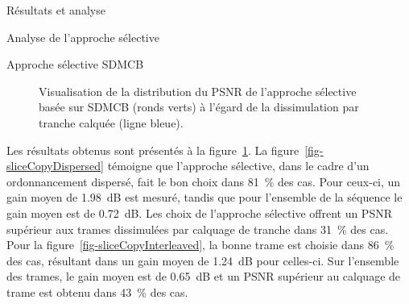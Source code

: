 \documentclass[letterpaper, twoside, 12pt,memoire]{thETS}
\newcommand{\SC}[1]{%
	{
	\todo[inline,color={red!100!green!33}]{%
	\textbf{[SC]:}~#1}
	}}
\newcommand{\fig}[1]{figure~\ref{#1}}
\providecommand{\DIFaddbegin}{} %
\providecommand{\DIFaddend}{} %
\begin{document}
\begin{chapter}{Résultats et analyse}
\begin{section}{Analyse de l'approche sélective}
\begin{subsection}{Approche sélective SDMCB}
\begin{figure}[htb]
\caption{Visualisation de la distribution du PSNR de l'approche sélective basée
sur SDMCB (ronds verts) à l'égard de la dissimulation par tranche calquée (ligne
bleue).}
\label{fig-SelectiveSliceCopy}
\end{figure}\DIFaddbegin \SC{Ronds ou cercles?}
\DIFaddend 

Les résultats obtenus sont présentés à la \fig{fig-SelectiveSliceCopy}. La
\fig{fig-sliceCopyDispersed} témoigne que l'approche sélective, dans le cadre
d'un ordonnancement dispersé, fait le bon choix dans 81~\% des cas. Pour
ceux-ci, un gain moyen de 1.98~dB est mesuré, tandis que pour l'ensemble de la
séquence le gain moyen est de 0.72~dB. Les choix de l'approche sélective offrent
un PSNR supérieur aux trames dissimulées par calquage de tranche dans 31~\% des
cas. Pour la \fig{fig-sliceCopyInterleaved}, la bonne trame est choisie dans
86~\% des cas, résultant dans un gain moyen de 1.24~dB pour celles-ci. Sur
l'ensemble des trames, le gain moyen est de 0.65~dB et un PSNR supérieur au
calquage de trame est obtenu dans 43~\% des cas.


\end{subsection}
\end{section}
\end{chapter}
\end{document}
